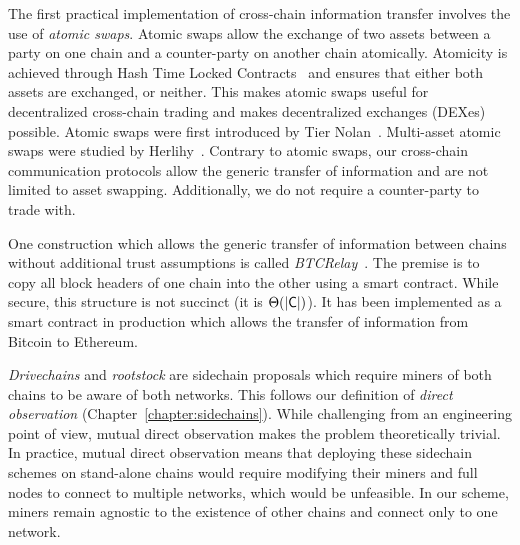The first practical implementation of cross-chain information transfer involves
the use of \emph{atomic swaps}. Atomic swaps allow the exchange of two assets
between a party on one chain and a counter-party on another chain atomically.
Atomicity is achieved through Hash Time Locked Contracts~\cite{lightning} and
ensures that either both assets are exchanged, or neither. This makes atomic
swaps useful for decentralized cross-chain trading and makes decentralized
exchanges (DEXes) possible. Atomic swaps were first introduced by Tier
Nolan~\cite{tiernolan}. Multi-asset atomic swaps were studied by
Herlihy~\cite{herlihy2018atomic}. Contrary to atomic swaps, our cross-chain
communication protocols allow the generic transfer of information and are not
limited to asset swapping. Additionally, we do not require a counter-party to
trade with.

One construction which allows the generic transfer of information between chains
without additional trust assumptions is called \emph{BTCRelay}~\cite{btcrelay}.
The premise is to copy all block headers of one chain into the other using a
smart contract. While secure, this structure is not succinct (it is
$\Theta(|\mathsf{C}|)$). It has been implemented as a smart contract in production
which allows the transfer of information from Bitcoin to Ethereum.

\emph{Drivechains} and \emph{rootstock} are sidechain proposals which require
miners of both chains to be aware of both networks. This follows our definition
of \emph{direct observation} (Chapter~\ref{chapter:sidechains}). While
challenging from an engineering point of view, mutual direct observation makes
the problem theoretically trivial. In practice, mutual direct observation means
that deploying these sidechain schemes on stand-alone chains would require
modifying their miners and full nodes to connect to multiple networks, which
would be unfeasible. In our scheme, miners remain agnostic to the
existence of other chains and connect only to one network.

